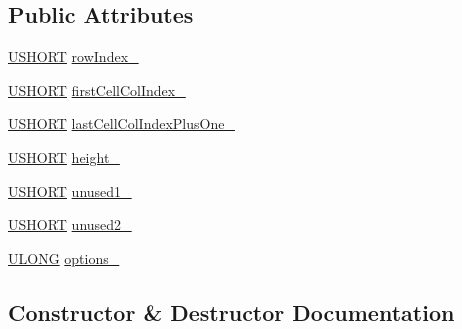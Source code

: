 \subsection*{Public Attributes}
\begin{DoxyCompactItemize}
\item 
\hyperlink{_basic_excel_8hpp_a5850d5316caf7f4cedd742fdf8cd7c02}{U\+S\+H\+O\+R\+T} \hyperlink{struct_y_excel_1_1_worksheet_1_1_cell_table_1_1_row_block_1_1_row_a81473b28d0ea987d15a8ca768d9182aa}{row\+Index\+\_\+}
\item 
\hyperlink{_basic_excel_8hpp_a5850d5316caf7f4cedd742fdf8cd7c02}{U\+S\+H\+O\+R\+T} \hyperlink{struct_y_excel_1_1_worksheet_1_1_cell_table_1_1_row_block_1_1_row_a48241e512d695f4b56f8993ab7bdfcc2}{first\+Cell\+Col\+Index\+\_\+}
\item 
\hyperlink{_basic_excel_8hpp_a5850d5316caf7f4cedd742fdf8cd7c02}{U\+S\+H\+O\+R\+T} \hyperlink{struct_y_excel_1_1_worksheet_1_1_cell_table_1_1_row_block_1_1_row_a10d4d4c5befb518e9b85fdd75a50df34}{last\+Cell\+Col\+Index\+Plus\+One\+\_\+}
\item 
\hyperlink{_basic_excel_8hpp_a5850d5316caf7f4cedd742fdf8cd7c02}{U\+S\+H\+O\+R\+T} \hyperlink{struct_y_excel_1_1_worksheet_1_1_cell_table_1_1_row_block_1_1_row_afcf63c3ba038caec29c55e03a084a54c}{height\+\_\+}
\item 
\hyperlink{_basic_excel_8hpp_a5850d5316caf7f4cedd742fdf8cd7c02}{U\+S\+H\+O\+R\+T} \hyperlink{struct_y_excel_1_1_worksheet_1_1_cell_table_1_1_row_block_1_1_row_ad0a1a74af4c5c3edc88be1862d9bb061}{unused1\+\_\+}
\item 
\hyperlink{_basic_excel_8hpp_a5850d5316caf7f4cedd742fdf8cd7c02}{U\+S\+H\+O\+R\+T} \hyperlink{struct_y_excel_1_1_worksheet_1_1_cell_table_1_1_row_block_1_1_row_a0f9c7dbe4422422fef0255609a1ca959}{unused2\+\_\+}
\item 
\hyperlink{_basic_excel_8hpp_abe09d1bea023be6a07cbadde8e955435}{U\+L\+O\+N\+G} \hyperlink{struct_y_excel_1_1_worksheet_1_1_cell_table_1_1_row_block_1_1_row_a99a57294efcae6bdcbba4495ba619e94}{options\+\_\+}
\end{DoxyCompactItemize}


\subsection{Constructor \& Destructor Documentation}
\hypertarget{struct_y_excel_1_1_worksheet_1_1_cell_table_1_1_row_block_1_1_row_a9bf5c9099c96ee22982be66608d7db76}{}
